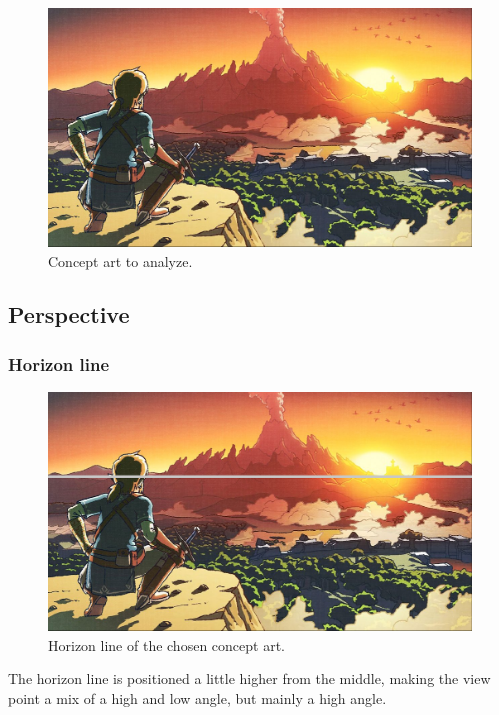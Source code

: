 \documentclass{cup-pan}
\begin{document}
    \begin{figure}[H]
       \includegraphics[width=\textwidth]{Imagenes/Referencias/conceptart_a_analizar_2.png}
        \caption{Concept art to analyze.}
    \end{figure}
    \newpage
        \subsection{Perspective}
            \subsubsection{Horizon line}
                \begin{figure}[H]
                    \includegraphics[width=\textwidth]{Imagenes/Referencias/Analisis_ConceptArt/horizonte.png}
                    \caption{Horizon line of the chosen concept art.}
                \end{figure}

                The horizon line is positioned a little higher from the middle, making the view point a mix of a high and low angle, but mainly a high angle. \\
\end{document}
